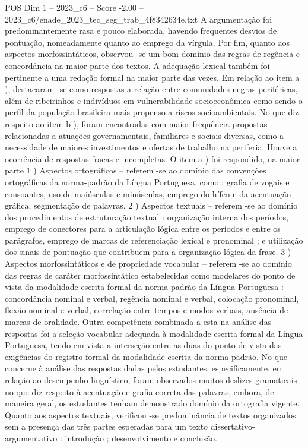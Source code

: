 \begin{textsample}{POS Dim 1 – 2023\_c6 – Score -2.00 – 2023\_c6/enade\_2023\_tec\_seg\_trab\_4f8342634e.txt}
A argumentação foi predominantemente rasa e pouco elaborada, havendo frequentes desvios de pontuação, nomeadamente quanto ao emprego da vírgula.
Por fim, quanto aos aspectos morfossintáticos, observou -se um bom domínio das regras de regência e concordância na maior parte dos textos.
A adequação lexical também foi pertinente a uma redação formal na maior parte das vezes.
Em relação ao item a ), destacaram -se como respostas a relação entre comunidades negras periféricas, além de ribeirinhos e indivíduos em vulnerabilidade socioeconômica como sendo o perfil da população brasileira mais propenso a riscos socioambientais.
No que diz respeito ao item b ), foram encontradas com maior frequência propostas relacionadas a atuações governamentais, familiares e sociais diversas, como a necessidade de maiores investimentos e ofertas de trabalho na periferia.
Houve a ocorrência de respostas fracas e incompletas.
O item a ) foi respondido, na maior parte 1 ) Aspectos ortográficos – referem -se ao domínio das convenções ortográficas da norma-padrão da Língua Portuguesa, como : grafia de vogais e consoantes, uso de maiúsculas e minúsculas, emprego do hífen e da acentuação gráfica, segmentação de palavras. 2 ) Aspectos textuais – referem -se ao domínio dos procedimentos de estruturação textual : organização interna dos períodos, emprego de conectores para a articulação lógica entre os períodos e entre os parágrafos, emprego de marcas de referenciação lexical e pronominal ; e utilização dos sinais de pontuação que contribuem para a organização lógica da frase. 3 ) Aspectos morfossintáticos e de propriedade vocabular – referem -se ao domínio das regras de caráter morfossintático estabelecidas como modelares do ponto de vista da modalidade escrita formal da norma-padrão da Língua Portuguesa : concordância nominal e verbal, regência nominal e verbal, colocação pronominal, flexão nominal e verbal, correlação entre tempos e modos verbais, ausência de marcas de oralidade.
Outra competência combinada a esta na análise das respostas foi a seleção vocabular adequada à modalidade escrita formal da Língua Portuguesa, tendo em vista a interseção entre as duas do ponto de vista das exigências do registro formal da modalidade escrita da norma-padrão.
No que concerne à análise das respostas dadas pelos estudantes, especificamente, em relação ao desempenho linguístico, foram observados muitos deslizes gramaticais no que diz respeito à acentuação e grafia correta das palavras, embora, de maneira geral, os estudantes tenham demonstrado domínio da ortografia vigente.
Quanto aos aspectos textuais, verificou -se predominância de textos organizados sem a presença das três partes esperadas para um texto dissertativo-argumentativo : introdução ; desenvolvimento e conclusão.

\end{textsample}

